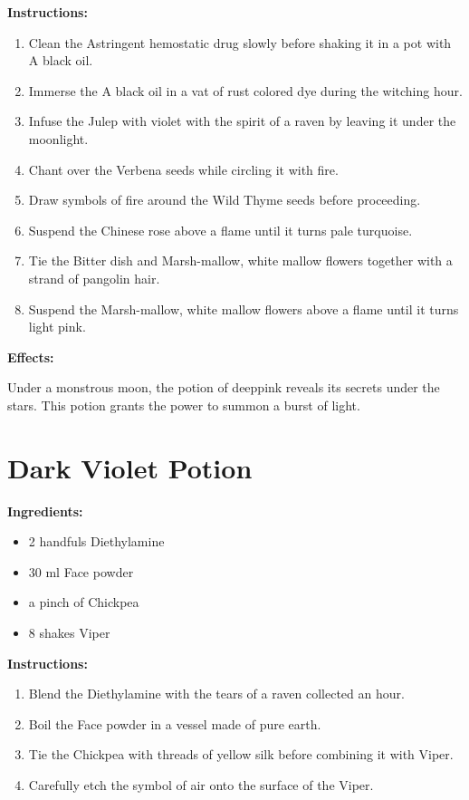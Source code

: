\documentclass{article}
\begin{document}
\textbf{Instructions:}

\begin{enumerate}
  \item Clean the Astringent hemostatic drug slowly before shaking it in a pot with A black oil.
  \item Immerse the A black oil in a vat of rust colored dye during the witching hour.
  \item Infuse the Julep with violet with the spirit of a raven by leaving it under the moonlight.
  \item Chant over the Verbena seeds while circling it with fire.
  \item Draw symbols of fire around the Wild Thyme seeds before proceeding.
  \item Suspend the Chinese rose above a flame until it turns pale turquoise.
  \item Tie the Bitter dish and Marsh-mallow, white mallow flowers together with a strand of pangolin hair.
  \item Suspend the Marsh-mallow, white mallow flowers above a flame until it turns light pink.
\end{enumerate}

\textbf{Effects:}

Under a monstrous moon, the potion of deeppink reveals its secrets under the stars. This potion grants the power to summon a burst of light.

\newpage
\section*{Dark Violet Potion}

\textbf{Ingredients:}

\begin{itemize}
  \item 2 handfuls Diethylamine
  \item 30 ml Face powder
  \item a pinch of Chickpea
  \item 8 shakes Viper
\end{itemize}

\textbf{Instructions:}

\begin{enumerate}
  \item Blend the Diethylamine with the tears of a raven collected an hour.
  \item Boil the Face powder in a vessel made of pure earth.
  \item Tie the Chickpea with threads of yellow silk before combining it with Viper.
  \item Carefully etch the symbol of air onto the surface of the Viper.
\end{enumerate}
\end{document}
